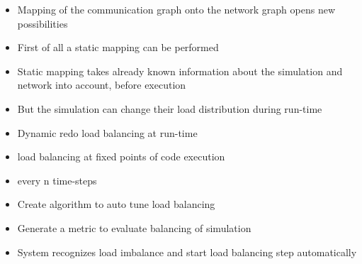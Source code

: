 \begin{itemize}
\item Mapping of the communication graph onto the network graph opens
  new possibilities
\item First of all a static mapping can be performed

\item Static mapping takes already known information about the
  simulation and network into account, before execution
\item But the simulation can change their load distribution during
  run-time

\item Dynamic redo load balancing at run-time
\item load balancing at fixed points of code execution
\item every n time-steps

\item Create algorithm to auto tune load balancing
\item Generate a metric to evaluate balancing of simulation
\item System recognizes load imbalance and start
  load balancing step automatically
\end{itemize}


